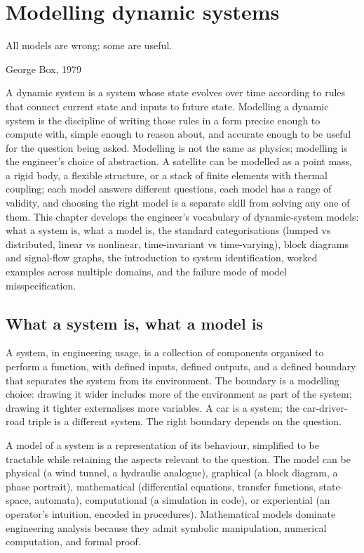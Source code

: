\chapter{Modelling dynamic systems}
\label{vol09:ch01}

\epigraph{All models are wrong; some are useful.}{George Box, 1979}


\noindent
A dynamic system is a system whose state evolves over time according to rules that connect current state and inputs to future state. Modelling a dynamic system is the discipline of writing those rules in a form precise enough to compute with, simple enough to reason about, and accurate enough to be useful for the question being asked. Modelling is not the same as physics; modelling is the engineer's choice of abstraction. A satellite can be modelled as a point mass, a rigid body, a flexible structure, or a stack of finite elements with thermal coupling; each model answers different questions, each model has a range of validity, and choosing the right model is a separate skill from solving any one of them. This chapter develops the engineer's vocabulary of dynamic-system models: what a system is, what a model is, the standard categorisations (lumped vs distributed, linear vs nonlinear, time-invariant vs time-varying), block diagrams and signal-flow graphs, the introduction to system identification, worked examples across multiple domains, and the failure mode of model misspecification.

\section{What a system is, what a model is}

A system, in engineering usage, is a collection of components organised to perform a function, with defined inputs, defined outputs, and a defined boundary that separates the system from its environment. The boundary is a modelling choice: drawing it wider includes more of the environment as part of the system; drawing it tighter externalises more variables. A car is a system; the car-driver-road triple is a different system. The right boundary depends on the question.

A model of a system is a representation of its behaviour, simplified to be tractable while retaining the aspects relevant to the question. The model can be physical (a wind tunnel, a hydraulic analogue), graphical (a block diagram, a phase portrait), mathematical (differential equations, transfer functions, state-space, automata), computational (a simulation in code), or experiential (an operator's intuition, encoded in procedures). Mathematical models dominate engineering analysis because they admit symbolic manipulation, numerical computation, and formal proof.

